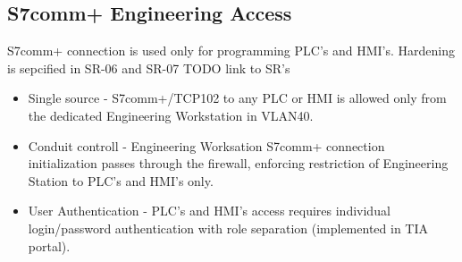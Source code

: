 \subsection{S7comm+ Engineering Access}
S7comm+ connection is used only for programming PLC's and HMI's. Hardening is sepcified in SR-06 and SR-07 TODO link to SR's
\begin{itemize}
    \item Single source - S7comm+/TCP102 to any PLC or HMI is allowed only from the dedicated Engineering Workstation in VLAN40.
    \item Conduit controll - Engineering Worksation S7comm+ connection initialization passes through the firewall, enforcing restriction of Engineering Station to PLC's and HMI's only.
    \item User Authentication - PLC's and HMI's access requires individual login/password authentication with role separation (implemented in TIA portal).
\end{itemize}

